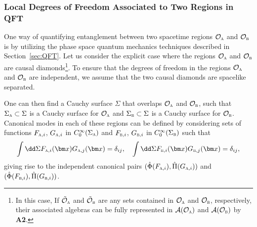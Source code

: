 \documentclass[letterpaper,12pt,titlepage,oneside,final]{book}
\newcommand{\tc}[1]{\textsc{#1}}
\begin{document}
\subsubsection*{Local Degrees of Freedom Associated to Two Regions in QFT}

One way of quantifying entanglement between two spacetime regions $\mathcal{O}_\tc{a}$ and $\mathcal{O}_\tc{b}$ is by utilizing the phase space quantum mechanics techniques described in Section~\ref{sec:QFT}. Let us consider the explicit case where the regions $\mathcal{O}_\tc{a}$ and $\mathcal{O}_\tc{b}$ are causal diamonds\footnote{In this case, If $\tilde{\mathcal{O}}_\tc{a}$ and $\tilde{\mathcal{O}}_\tc{b}$ are any sets contained in $\mathcal{O}_\tc{a}$ and  $\mathcal{O}_\tc{b}$, respectively, their associated algebras can be fully represented in $\mathcal{A}(\mathcal{O}_\tc{a})$ and $\mathcal{A}(\mathcal{O}_\tc{b})$ by \textbf{A2}.}. To ensure that the degrees of freedom in the regions $\mathcal{O}_\tc{a}$ and $\mathcal{O}_\tc{b}$ are independent, we assume that the two causal diamonds are spacelike separated. 

One can then find a Cauchy surface $\Sigma$ that overlaps $\mathcal{O}_\tc{a}$ and $\mathcal{O}_\tc{b}$, such that $\Sigma_\tc{a}\subset\Sigma$ is a Cauchy surface for $\mathcal{O}_\tc{a}$ and $\Sigma_\tc{b}\subset\Sigma$ is a Cauchy surface for $\mathcal{O}_\tc{b}$. Canonical modes in each of these regions can be defined by considering sets of functions $F_{\tc{a},i}$, $G_{\tc{a},i}$ in $C_0^\infty(\Sigma_\tc{a})$ and $F_{\tc{b},i}$, $G_{\tc{b},i}$ in $C_0^\infty(\Sigma_\tc{b})$ such that
\begin{equation}
    \int \dd\Sigma F_{\tc{a},i}(\bm x) G_{\tc{a},j}(\bm x) = \delta_{ij}, \quad 
    \int \dd\Sigma F_{\tc{b},i}(\bm x) G_{\tc{b},j}(\bm x) = \delta_{ij},
\end{equation}
giving rise to the independent canonical pairs $(\hat{\Phi}(F_{\tc{a},i}),\hat{\Pi}(G_{\tc{a},i}))$ and $(\hat{\Phi}(F_{\tc{b},i}), \hat{\Pi}(G_{\tc{b},i}))$. 
\end{document}
